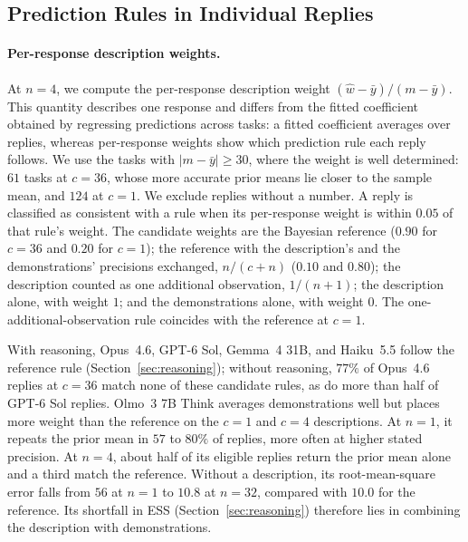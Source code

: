 \subsection{Prediction Rules in Individual Replies}\label{sec:llm-rules}

\paragraph{Per-response description weights.}
At $n=4$, we compute the per-response description weight $(\hat w-\bar y)/(m-\bar y)$. This quantity describes one response and differs from the fitted coefficient obtained by regressing predictions across tasks: a fitted coefficient averages over replies, whereas per-response weights show which prediction rule each reply follows. We use the tasks with $|m-\bar y|\geq30$, where the weight is well determined: $61$ tasks at $c=36$, whose more accurate prior means lie closer to the sample mean, and $124$ at $c=1$. We exclude replies without a number. A reply is classified as consistent with a rule when its per-response weight is within $0.05$ of that rule's weight. The candidate weights are the Bayesian reference ($0.90$ for $c=36$ and $0.20$ for $c=1$); the reference with the description's and the demonstrations' precisions exchanged, $n/(c+n)$ ($0.10$ and $0.80$); the description counted as one additional observation, $1/(n+1)$; the description alone, with weight $1$; and the demonstrations alone, with weight $0$. The one-additional-observation rule coincides with the reference at $c=1$.

With reasoning, Opus~4.6, GPT-6 Sol, Gemma~4 31B, and Haiku~5.5 follow the reference rule (Section~\ref{sec:reasoning}); without reasoning, $77\%$ of Opus~4.6 replies at $c=36$ match none of these candidate rules, as do more than half of GPT-6 Sol replies. Olmo~3 7B Think averages demonstrations well but places more weight than the reference on the $c=1$ and $c=4$ descriptions. At $n=1$, it repeats the prior mean in $57$ to $80\%$ of replies, more often at higher stated precision. At $n=4$, about half of its eligible replies return the prior mean alone and a third match the reference. Without a description, its root-mean-square error falls from $56$ at $n=1$ to $10.8$ at $n=32$, compared with $10.0$ for the reference. Its shortfall in ESS (Section~\ref{sec:reasoning}) therefore lies in combining the description with demonstrations.

